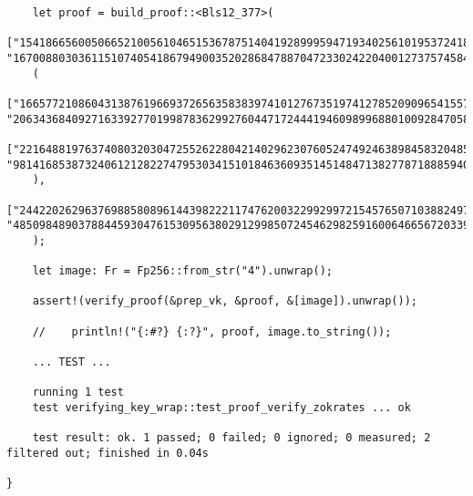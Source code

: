 \documentclass{article}
\begin{document}
\begin{lstlisting}
    let proof = build_proof::<Bls12_377>(
	["15418665600506652100561046515367875140419289995947193402561019537241872027964827224166724343705483346143470852731", "167008803036115107405418679490035202868478870472330242204001273757458478058714648975048495328133467760891608546148"],
	(
	    ["166577210860431387619669372656358383974101276735197412785209096541557319817228478432621330273001881927051445417406", "206343684092716339277019987836299276044717244419460989968801009284705815340411102589748352273738828474466157094245"],
	    ["221648819763740803203047255262280421402962307605247492463898458320485549262445592950081729098224237965423853570558", "98141685387324061212822747953034151018463609351451484713827787188859406641166893569975083223024556896317502938904"]
	),
	["244220262963769885808961443982221174762003229929972154576507103882497536855742220170129599313242682265347284028286", "48509848903788445930476153095638029129985072454629825916006466567203396769632018246628830229692992210820821493168"]
    );

    let image: Fr = Fp256::from_str("4").unwrap();

    assert!(verify_proof(&prep_vk, &proof, &[image]).unwrap());

    //    println!("{:#?} {:?}", proof, image.to_string());

    ... TEST ...

    running 1 test
    test verifying_key_wrap::test_proof_verify_zokrates ... ok

    test result: ok. 1 passed; 0 failed; 0 ignored; 0 measured; 2 filtered out; finished in 0.04s

}

\end{lstlisting}
\end{document}
